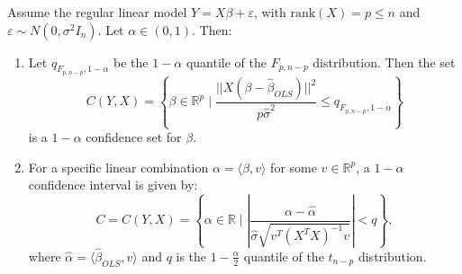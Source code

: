 \documentclass[open=any, 11pt,paper=A4]{scrreprt}
\begin{document}
\begin{theorem}
Assume the regular linear model \(Y = X\beta + \varepsilon\), with \(\text{rank}(X) = p \le n\) and \(\varepsilon \sim N(0, \sigma^2 I_n)\). Let \(\alpha \in (0,1)\). Then:

\begin{enumerate}
    \item 
    Let \(q_{F_{p, n-p},1-\alpha}\) be the \(1-\alpha\) quantile of the \(F_{p, n-p}\) distribution. Then the set
    \[
    C(Y, X) = \left\{\beta \in \mathbb{R}^p \mid \frac{||X (\beta - \hat{\beta}_{OLS})||^2}{p \hat{\sigma}^2} \le q_{F_{p, n-p},1-\alpha} \right\}
    \]
    is a \(1-\alpha\) confidence set for \(\beta\).
    
    \item 
    For a specific linear combination \(\alpha = \langle \beta, v \rangle\) for some \(v \in \mathbb{R}^p\), a \(1-\alpha\) confidence interval is given by:
    \[
    C = C(Y, X) = \left\{ \alpha \in \mathbb{R} \mid \left| \frac{\alpha - \hat{\alpha}}{\hat{\sigma} \sqrt{v^T (X^TX)^{-1} v}} \right| < q \right\},
    \]
    where \(\hat{\alpha} = \langle \hat{\beta}_{OLS}, v \rangle\) and \(q\) is the \(1 - \frac{\alpha}{2}\) quantile of the \(t_{n-p}\) distribution.
\end{enumerate}
\end{theorem}
\end{document}
